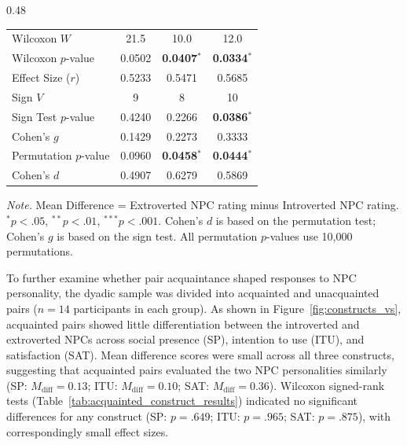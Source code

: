 \documentclass[a4paper,fleqn]{cas-sc}
\begin{document}
\begin{table}[t]
\begin{subtable}[t]{0.48\textwidth}
\begin{tabular}{lccc}
Wilcoxon $W$ & 21.5 & 10.0 & 12.0 \\
Wilcoxon $p$-value
& 0.0502
& \textbf{0.0407}$^{*}$
& \textbf{0.0334}$^{*}$ \\
Effect Size ($r$) & 0.5233 & 0.5471 & 0.5685 \\
\midrule
Sign $V$ & 9 & 8 & 10 \\
Sign Test $p$-value
& 0.4240
& 0.2266
& \textbf{0.0386}$^{*}$ \\
Cohen's $g$ & 0.1429 & 0.2273 & 0.3333 \\
\midrule
Permutation $p$-value
& 0.0960
& \textbf{0.0458}$^{*}$
& \textbf{0.0444}$^{*}$ \\
Cohen's $d$ & 0.4907 & 0.6279 & 0.5869 \\
\bottomrule
\end{tabular}
\end{subtable}

\vspace{2mm}
\begin{minipage}{0.98\textwidth}
\footnotesize
\textit{Note.} Mean Difference = Extroverted NPC rating minus Introverted NPC rating.
$^{*}p < .05$, $^{**}p < .01$, $^{***}p < .001$.
Cohen's $d$ is based on the permutation test; Cohen's $g$ is based on the sign test.
All permutation $p$-values use 10,000 permutations.
\end{minipage}

\end{table}

To further examine whether pair acquaintance shaped responses to NPC personality, the dyadic sample was divided into acquainted and unacquainted pairs ($n=14$ participants in each group). As shown in Figure~\ref{fig:constructs_vs}, acquainted pairs showed little differentiation between the introverted and extroverted NPCs across social presence (SP), intention to use (ITU), and satisfaction (SAT). Mean difference scores were small across all three constructs, suggesting that acquainted pairs evaluated the two NPC personalities similarly (SP: $M_{\mathrm{diff}} =0.13$; ITU: $M_{\mathrm{diff}}=0.10$; SAT: $M_{\mathrm{diff}}=0.36$). Wilcoxon signed-rank tests (Table~\ref{tab:acquainted_construct_results}) indicated no significant differences for any construct (SP: $p=.649$; ITU: $p=.965$; SAT: $p=.875$), with correspondingly small effect sizes.
\end{document}
